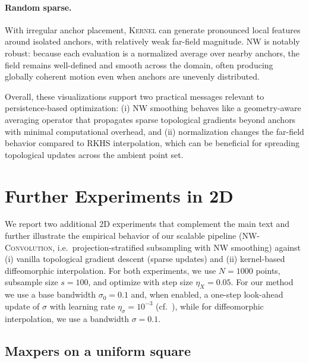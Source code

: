 \documentclass{article} %
\theoremstyle{plain}
\theoremstyle{definition}
\theoremstyle{remark}
\begin{document}
\paragraph{Random sparse.}
With irregular anchor placement, \textsc{Kernel} can generate pronounced local features around isolated anchors, with
relatively weak far-field magnitude.
\textsc{NW} is notably robust: because each evaluation is a normalized average over nearby anchors, the field remains
well-defined and smooth across the domain, often producing globally coherent motion even when anchors are unevenly
distributed.

\noindent
Overall, these visualizations support two practical messages relevant to persistence-based optimization: (i) NW smoothing
behaves like a geometry-aware averaging operator that propagates sparse topological gradients beyond anchors with minimal
computational overhead, and (ii) normalization changes the far-field behavior compared to RKHS interpolation, which can be
beneficial for spreading topological updates across the ambient point set.


\clearpage
\section{Further Experiments in 2D}
\label{app:more_2d}

We report two additional $2$D experiments that complement the main text and further illustrate the empirical behavior of
our scalable pipeline (\textsc{NW-Convolution}, i.e.\ projection-stratified subsampling with NW smoothing) against (i) vanilla
topological gradient descent (sparse updates) and (ii) kernel-based diffeomorphic interpolation.
For both experiments, we use $N=1000$ points, subsample size $s=100$, and optimize with step size $\eta_X=0.05$. For our method we use a base bandwidth $\sigma_0=0.1$ and, when enabled,
a one-step look-ahead update of $\sigma$ with learning rate $\eta_\sigma=10^{-3}$ (cf.\ ), while for diffeomorphic interpolation, we use a bandwidth $\sigma = 0.1$.

\subsection{Maxpers on a uniform square}
\label{app:maxpers_2d}
\end{document}

